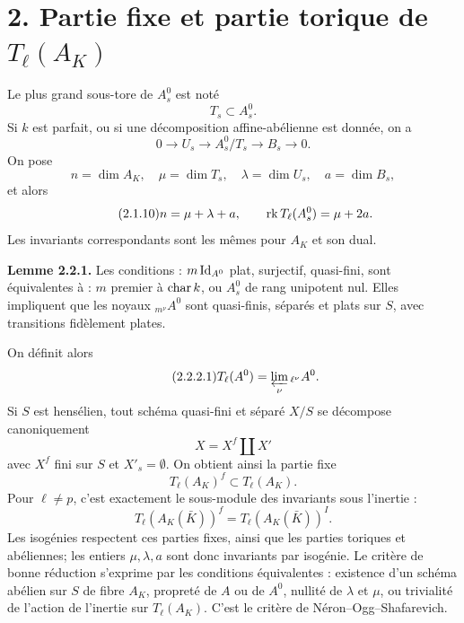 \documentclass[11pt]{article}
\begin{document}
\section*{2. Partie fixe et partie torique de \(T_\ell(A_K)\)}
Le plus grand sous-tore de \(A_s^0\) est not\'e
\begin{equation}\tag{2.1.1}
 T_s\subset A_s^0.
\end{equation}
Si \(k\) est parfait, ou si une d\'ecomposition affine-ab\'elienne est donn\'ee, on a
\begin{equation}\tag{2.1.2}
 0\longrightarrow U_s\longrightarrow A_s^0/T_s\longrightarrow B_s\longrightarrow0.
\end{equation}
On pose
\begin{equation}\tag{2.1.9}
 n=\dim A_K,
 \quad \mu=\dim T_s,
 \quad \lambda=\dim U_s,
 \quad a=\dim B_s,
\end{equation}
et alors
\begin{equation}\tag{2.1.10}
 n=\mu+\lambda+a,
 \qquad
 \operatorname{rk} T_\ell(A_s^0)=\mu+2a.
\end{equation}
Les invariants correspondants sont les m\^emes pour \(A_K\) et son dual.

\textbf{Lemme 2.2.1.}  Les conditions : \(m\operatorname{Id}_{A^0}\) plat, surjectif, quasi-fini, sont \'equivalentes \`a : \(m\) premier \`a \(\operatorname{char} k\), ou \(A_s^0\) de rang unipotent nul.  Elles impliquent que les noyaux \({}_{m^\nu}A^0\) sont quasi-finis, s\'epar\'es et plats sur \(S\), avec transitions fid\`element plates.

On d\'efinit alors
\begin{equation}\tag{2.2.2.1}
 T_\ell(A^0)=\varprojlim_\nu {}_{\ell^\nu}A^0.
\end{equation}
Si \(S\) est hens\'elien, tout sch\'ema quasi-fini et s\'epar\'e \(X/S\) se d\'ecompose canoniquement
\begin{equation}\tag{2.2.3.1}
 X=X^f\amalg X'
\end{equation}
avec \(X^f\) fini sur \(S\) et \(X'_s=\emptyset\).  On obtient ainsi la partie fixe
\begin{equation}\tag{2.2.3.4}
 T_\ell(A_K)^f\subset T_\ell(A_K).
\end{equation}
Pour \(\ell\ne p\), c'est exactement le sous-module des invariants sous l'inertie :
\begin{equation}\tag{2.2.5}
 T_\ell(A_K(\bar K))^f=T_\ell(A_K(\bar K))^I.
\end{equation}
Les isog\'enies respectent ces parties fixes, ainsi que les parties toriques et ab\'eliennes; les entiers \(\mu,\lambda,a\) sont donc invariants par isog\'enie.  Le crit\`ere de bonne r\'eduction s'exprime par les conditions \'equivalentes : existence d'un sch\'ema ab\'elien sur \(S\) de fibre \(A_K\), propret\'e de \(A\) ou de \(A^0\), nullit\'e de \(\lambda\) et \(\mu\), ou trivialit\'e de l'action de l'inertie sur \(T_\ell(A_K)\).  C'est le crit\`ere de N\'eron--Ogg--Shafarevich.
\end{document}
